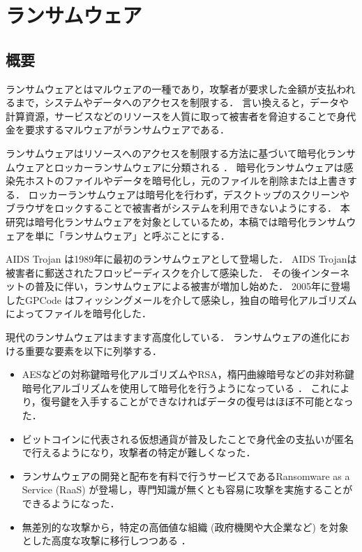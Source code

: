 \chapter{ランサムウェア}





\section{概要}

ランサムウェアとはマルウェアの一種であり，攻撃者が要求した金額が支払われるまで，システムやデータへのアクセスを制限する．
言い換えると，データや計算資源，サービスなどのリソースを人質に取って被害者を脅迫することで身代金を要求するマルウェアがランサムウェアである．

ランサムウェアはリソースへのアクセスを制限する方法に基づいて暗号化ランサムウェアとロッカーランサムウェアに分類される \cite{oz2022survey}．
暗号化ランサムウェアは感染先ホストのファイルやデータを暗号化し，元のファイルを削除または上書きする．
ロッカーランサムウェアは暗号化を行わず，デスクトップのスクリーンやブラウザをロックすることで被害者がシステムを利用できないようにする．
本研究は暗号化ランサムウェアを対象としているため，本稿では暗号化ランサムウェアを単に「ランサムウェア」と呼ぶことにする．

AIDS Trojan \cite{aids-trojan} は1989年に最初のランサムウェアとして登場した．
AIDS Trojanは被害者に郵送されたフロッピーディスクを介して感染した．
その後インターネットの普及に伴い，ランサムウェアによる被害が増加し始めた．
2005年に登場したGPCode \cite{PGPCoder42:online} はフィッシングメールを介して感染し，独自の暗号化アルゴリズムによってファイルを暗号化した．

現代のランサムウェアはますます高度化している．
ランサムウェアの進化における重要な要素を以下に列挙する．
\begin{itemize}
  \item AESなどの対称鍵暗号化アルゴリズムやRSA，楕円曲線暗号などの非対称鍵暗号化アルゴリズムを使用して暗号化を行うようになっている \cite{Evolution-Ransomware}．
        これにより，復号鍵を入手することができなければデータの復号はほぼ不可能となった．

  \item ビットコインに代表される仮想通貨が普及したことで身代金の支払いが匿名で行えるようになり，攻撃者の特定が難しくなった．

  \item ランサムウェアの開発と配布を有料で行うサービスであるRansomware as a Service (RaaS) が登場し，専門知識が無くとも容易に攻撃を実施することができるようになった．

  \item 無差別的な攻撃から，特定の高価値な組織 (政府機関や大企業など) を対象とした高度な攻撃に移行しつつある \cite{early-detection}．

\end{itemize}


